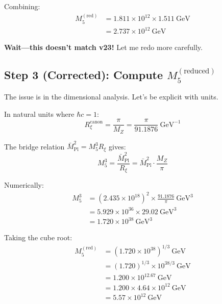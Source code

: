 \documentclass[11pt,a4paper]{article}
\newcommand{\Rxi}{R_\xi}
\newcommand{\Mplbar}{\bar{M}_{\mathrm{Pl}}}
\newcommand{\Mfive}{M_5}
\newcommand{\MZ}{M_Z}
\newcommand{\hbarc}{\hbar c}
\begin{document}
Combining:
\begin{align}
\Mfive^{\mathrm{(red)}} &= 1.811 \times 10^{12} \times 1.511~\mathrm{GeV} \label{eq:M5-red-combine}\\
&= 2.737 \times 10^{12}~\mathrm{GeV} \label{eq:M5-red-intermediate}
\end{align}

\textbf{Wait---this doesn't match v23!} Let me redo more carefully.

\subsection{Step 3 (Corrected): Compute $\Mfive^{\mathrm{(reduced)}}$}

The issue is in the dimensional analysis. Let's be explicit with units.

In natural units where $\hbarc = 1$:
\begin{equation}
\Rxi^{\mathrm{canon}} = \frac{\pi}{\MZ} = \frac{\pi}{91.1876}~\mathrm{GeV}^{-1}
\label{eq:Rxi-natural}
\end{equation}

The bridge relation $\Mplbar^2 = \Mfive^3 \Rxi$ gives:
\begin{equation}
\Mfive^3 = \frac{\Mplbar^2}{\Rxi} = \Mplbar^2 \cdot \frac{\MZ}{\pi}
\label{eq:M5-cubed-natural}
\end{equation}

Numerically:
\begin{align}
\Mfive^3 &= (2.435 \times 10^{18})^2 \times \frac{91.1876}{\pi}~\mathrm{GeV}^3
\label{eq:M5-cubed-step1}\\
&= 5.929 \times 10^{36} \times 29.02~\mathrm{GeV}^3 \label{eq:M5-cubed-step2}\\
&= 1.720 \times 10^{38}~\mathrm{GeV}^3 \label{eq:M5-cubed-result}
\end{align}

Taking the cube root:
\begin{align}
\Mfive^{\mathrm{(red)}} &= (1.720 \times 10^{38})^{1/3}~\mathrm{GeV}
\label{eq:M5-red-cuberoot}\\
&= (1.720)^{1/3} \times 10^{38/3}~\mathrm{GeV} \label{eq:M5-red-cuberoot2}\\
&= 1.200 \times 10^{12.67}~\mathrm{GeV} \label{eq:M5-red-cuberoot3}\\
&= 1.200 \times 4.64 \times 10^{12}~\mathrm{GeV} \label{eq:M5-red-cuberoot4}\\
&= 5.57 \times 10^{12}~\mathrm{GeV} \label{eq:M5-red-final}
\end{align}
\end{document}
